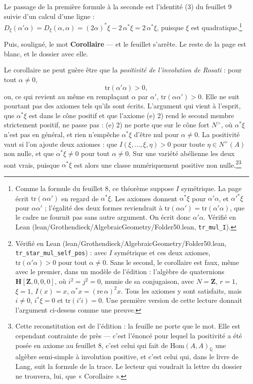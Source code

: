\documentclass[11pt,a4paper]{article}
\begin{document}
Le passage de la première formule à la seconde est l'identité (3) du feuillet 9
suivie d'un calcul d'une ligne : $D_{\xi}(\alpha'\alpha) = D_{\xi}(\alpha,\alpha)
= (2\alpha)^{*}\xi - 2\,\alpha^{*}\xi = 2\,\alpha^{*}\xi$, puisque $\xi$ est
quadratique.\footnote{Comme la formule du feuillet 8, ce théorème suppose $I$
symétrique. La page écrit $\mathrm{tr}(\alpha\alpha')$ en regard de
$\alpha^{*}\xi$. Les axiomes donnent $\alpha^{*}\xi$ pour $\alpha'\alpha$, et
$\alpha'^{*}\xi$ pour $\alpha\alpha'$ ; l'égalité des deux formes reviendrait
à $\mathrm{tr}(\alpha\alpha') = \mathrm{tr}(\alpha'\alpha)$, que le cadre ne
fournit pas sans autre argument. On écrit donc $\alpha'\alpha$. Vérifié en
Lean (lean/Grothendieck/AlgebraicGeometry/Folder50.lean, \texttt{tr\_mul\_I}).}

Puis, souligné, le mot \textbf{Corollaire} — et le feuillet s'arrête. Le reste
de la page est blanc, et le dossier avec elle.

Le corollaire ne peut guère être que la \emph{positivité de l'involution de
Rosati} : pour tout $\alpha \neq 0$,
\[
  \mathrm{tr}(\alpha'\alpha) > 0 ,
\]
ou, ce qui revient au même en remplaçant $\alpha$ par $\alpha'$,
$\mathrm{tr}(\alpha\alpha') > 0$. Elle ne suit pourtant pas des axiomes tels
qu'ils sont écrits. L'argument qui vient à l'esprit, que $\alpha^{*}\xi$ est
dans le cône positif et que l'axiome (e) 2) rend le second membre strictement
positif, ne passe pas : (e) 2) ne porte que sur le cône fort $N^{>}$, où
$\alpha^{*}\xi$ n'est pas en général, et rien n'empêche $\alpha^{*}\xi$ d'être
nul pour $\alpha \neq 0$. La positivité vaut si l'on ajoute deux axiomes : que
$I(\xi, \ldots, \xi, \eta) > 0$ pour toute $\eta \in N^{+}(A)$ non nulle, et
que $\alpha^{*}\xi \neq 0$ pour tout $\alpha \neq 0$. Sur une variété
abélienne les deux sont vrais, puisque $\alpha^{*}\xi$ est alors une classe
numériquement positive non nulle.\footnote{Vérifié en Lean
(lean/Grothendieck/AlgebraicGeometry/Folder50.lean, \texttt{tr\_star\_mul\_self\_pos}) : avec $I$
symétrique et ces deux axiomes, $\mathrm{tr}(\alpha'\alpha) > 0$ pour tout
$\alpha \neq 0$. Sans le second, le corollaire est faux, même avec le premier,
dans un modèle de l'édition : l'algèbre de quaternions $\mathbf{H}[\mathbf{Z}, 0,
0, 0]$, où $i^{2} = j^{2} = 0$, munie de sa conjugaison, avec $N = \mathbf{Z}$,
$r = 1$, $\xi = 1$, $I(x) = x$, $\alpha^{*}x = (\mathrm{re}\,\alpha)^{2}x$. Tous
les axiomes y sont satisfaits, mais $i \neq 0$, $i^{*}\xi = 0$ et
$\mathrm{tr}(i'i) = 0$. Une première version de cette lecture donnait l'argument
ci-dessus comme une preuve.}\footnote{Cette reconstitution est de l'édition : la
feuille ne porte que le mot. Elle est cependant contrainte de près — c'est l'énoncé pour lequel
la positivité a été posée en axiome au feuillet 8, c'est celui qui fait de
$\mathrm{Hom}(A,A)_{\mathbb{Q}}$ une algèbre semi-simple à involution positive,
et c'est celui qui, dans le livre de Lang, suit la formule de la trace. Le
lecteur qui voudrait la lettre du dossier ne trouvera, lui, que « Corollaire ».}
\end{document}

